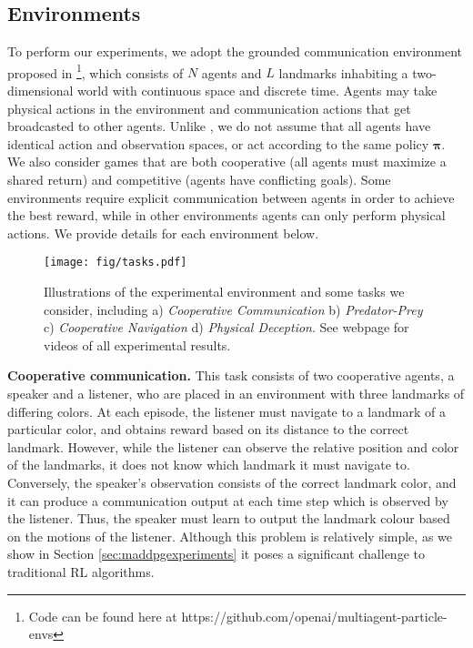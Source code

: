 \documentclass{article}
\newcommand{\pol}[0]{\pmb{\pi}}
\newcommand{\insertfigure}[3]{
\begin{figure}[ht]
\centering
\texttt{[image: fig/\#1]}
\caption{#3}
\label{fig:#1}
\end{figure}
}
\newcommand{\hide}[1]{}
\begin{document}
\subsection{Environments}
\label{sec:environments}
To perform our experiments, we adopt the grounded communication environment proposed in \cite{mordatch2017emergence}\footnote{Code can be found here at https://github.com/openai/multiagent-particle-envs}, which consists of $N$ agents and $L$ landmarks inhabiting a two-dimensional world with continuous space and discrete time. Agents may take physical actions in the environment and communication actions that get broadcasted to other agents. Unlike  \cite{mordatch2017emergence}, we do not assume that all agents have identical action and observation spaces, or act according to the same policy $\pol$. We also consider games that are both cooperative (all agents must maximize a shared return) and competitive (agents have conflicting goals). Some environments require explicit communication between agents in order to achieve the best reward, while in other environments agents can only perform physical actions. We provide details for each environment below.


\hide{
\insertfigure{tasks}{1.00}{Illustrations of the experimental environment and some tasks we consider, including a) \emph{Cooperative Communication} b) \emph{Predator-Prey} c) \emph{Cooperative Navigation} d) \emph{Physical Deception}. See webpage for videos of all experimental results.}
}

\begin{figure}[ht]
\centering
\texttt{[image: fig/tasks.pdf]}
\caption{Illustrations of the experimental environment and some tasks we consider, including a) \emph{Cooperative Communication} b) \emph{Predator-Prey} c) \emph{Cooperative Navigation} d) \emph{Physical Deception}. See webpage for videos of all experimental results.\vspace{-2mm}}
\label{fig:tasks}
\end{figure}






\textbf{Cooperative communication.} This task consists of two cooperative agents, a speaker and a listener, who are placed in an environment with three landmarks of differing colors. At each episode, the listener must navigate to a landmark of a particular color, and obtains reward based on its distance to the correct landmark. However, while the listener can observe the relative position and color of the landmarks, it does not know which landmark it must navigate to. Conversely, the speaker's observation consists of the correct landmark color, and it can produce a communication output at each time step which is observed by the listener. Thus, the speaker must learn to output the landmark colour based on the motions of the listener. 
Although this problem is relatively simple, as we show in Section \ref{sec:maddpgexperiments} it poses a significant challenge to traditional RL algorithms.
\end{document}
